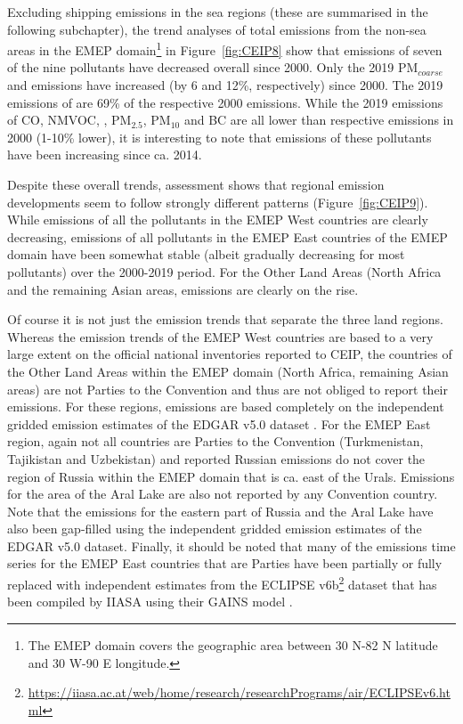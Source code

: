 Excluding shipping emissions in the sea regions (these are summarised in the following subchapter), the trend analyses of total emissions from the non-sea areas in the EMEP domain\footnote{The EMEP domain covers the geographic area between 30{\degrees} N-82{\degrees} N latitude and 30{\degrees} 
  W-90{\degrees} E longitude.} in Figure~\ref{fig:CEIP8} show that emissions of seven of the nine pollutants have decreased overall since 2000. Only the 2019 PM$_{coarse}$  and \nhiii emissions have increased (by 6 and 12\%, respectively) since 2000. The 2019 emissions of \sox are 69\% of the respective 2000 emissions. While the 2019 emissions of CO, NMVOC, \nox, PM$_{2.5}$, PM$_{10}$ and BC are all lower than respective emissions in 2000 (1-10\% lower), it is interesting to note that emissions of these pollutants have been increasing since ca. 2014.

Despite these overall trends, assessment shows that regional emission developments seem to follow strongly different patterns (Figure~\ref{fig:CEIP9}). While emissions of all the pollutants in the EMEP West countries are clearly decreasing, emissions of all pollutants in the EMEP East countries of the EMEP domain have been somewhat stable (albeit gradually decreasing for most pollutants) over the 2000-2019 period. For the Other Land Areas (North Africa and the remaining Asian areas, emissions are clearly on the rise.

Of course it is not just the emission trends that separate the three land regions. Whereas the emission trends of the EMEP West countries are based to a very large extent on the official national inventories reported to CEIP, the countries of the Other Land Areas within the EMEP domain (North Africa, remaining Asian areas) are not Parties to the Convention and thus are not obliged to report their emissions. For these regions, emissions are based completely on the independent gridded emission estimates of the EDGAR v5.0 dataset \citep{EDGARv50}. For the EMEP East region, again not all countries are Parties to the Convention (Turkmenistan, Tajikistan and Uzbekistan) and reported Russian emissions do not cover the region of Russia within the EMEP domain that is ca. east of the Urals. Emissions for the area of the Aral Lake are also not reported by any Convention country. Note that the emissions for the eastern part of Russia and the Aral Lake have also been gap-filled using the independent gridded emission estimates of the EDGAR v5.0 dataset. Finally, it should be noted that many of the emissions time series for the EMEP East countries that are Parties have been partially or fully replaced with independent estimates from the ECLIPSE v6b\footnote{\url{https://iiasa.ac.at/web/home/research/researchPrograms/air/ECLIPSEv6.html}} dataset that has been compiled by IIASA using their GAINS model  \citep{Amann_et_al:2011}.


